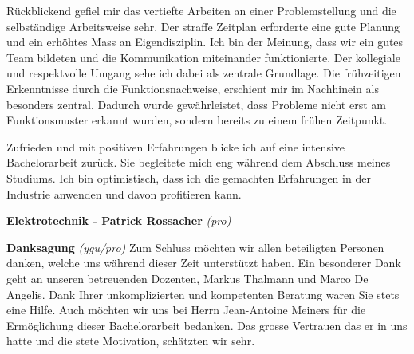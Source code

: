 Rückblickend gefiel mir das vertiefte Arbeiten an einer Problemstellung und die selbständige Arbeitsweise sehr. Der straffe Zeitplan erforderte eine gute Planung und ein erhöhtes Mass an Eigendisziplin. Ich bin der Meinung, dass wir ein gutes Team bildeten und die Kommunikation miteinander funktionierte. Der kollegiale und respektvolle Umgang sehe ich dabei als zentrale Grundlage. Die frühzeitigen Erkenntnisse durch die Funktionsnachweise, erschient mir im Nachhinein als besonders zentral. Dadurch wurde gewährleistet, dass Probleme nicht erst am Funktionsmuster erkannt wurden, sondern bereits zu einem frühen Zeitpunkt.
\newline

Zufrieden und mit positiven Erfahrungen blicke ich auf eine intensive Bachelorarbeit zurück. Sie begleitete mich eng während dem Abschluss meines Studiums. Ich bin optimistisch, dass ich die gemachten Erfahrungen in der Industrie anwenden und davon profitieren kann.
\newline

\textbf{Elektrotechnik - Patrick Rossacher}
\newline
\textit{(pro)}
\newline	

\textbf{Danksagung}
\newline
\textit{(ygu/pro)} Zum Schluss möchten wir allen beteiligten Personen danken, welche uns während dieser Zeit unterstützt haben. Ein besonderer Dank geht an unseren betreuenden Dozenten, Markus Thalmann und Marco De Angelis. Dank Ihrer unkomplizierten und kompetenten Beratung waren Sie stets eine Hilfe. Auch möchten wir uns bei Herrn Jean-Antoine Meiners für die Ermöglichung dieser Bachelorarbeit bedanken. Das grosse Vertrauen das er in uns hatte und die stete Motivation, schätzten wir sehr.

